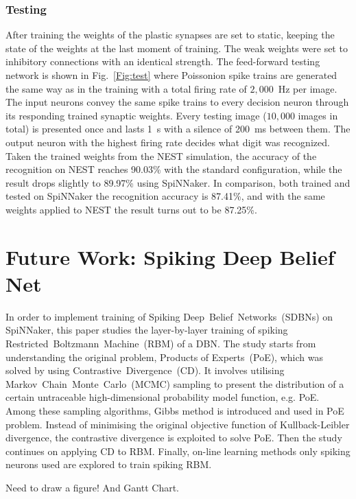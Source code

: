 \documentclass[journal]{journal}
\begin{document}
	\subsubsection{Testing}
	After training the weights of the plastic synapses are set to static, keeping the state of the weights at the last moment of training.
	The weak weights were set to inhibitory connections with an identical strength.
	The feed-forward testing network is shown in Fig.~\ref{Fig:test} where Poissonion spike trains are generated the same way as in the training with a total firing rate of $2,000$~Hz per image.
	The input neurons convey the same spike trains to every decision neuron through its responding trained synaptic weights. 
	Every testing image ($10,000$ images in total) is presented once and lasts 1~s with a silence of 200~ms between them.
	The output neuron with the highest firing rate decides what digit was recognized.
	Taken the trained weights from the NEST simulation, the accuracy of the recognition on NEST reaches 90.03\% with the standard configuration, while the result drops slightly to 89.97\% using SpiNNaker.
	In comparison, both trained and tested on SpiNNaker the recognition accuracy is 87.41\%, and with the same weights applied to NEST the result turns out to be 87.25\%.  
\section{Future Work: Spiking Deep Belief Net}
	In order to implement training of Spiking Deep~Belief~Networks~(SDBNs) on SpiNNaker, this paper studies the layer-by-layer training of spiking Restricted~Boltzmann~Machine~(RBM) of a DBN.
	The study starts from understanding the original problem, Products of Experts~(PoE), which was solved by using Contrastive~Divergence~(CD).
	It involves utilising Markov~Chain~Monte~Carlo~(MCMC) sampling to present the distribution of a certain untraceable high-dimensional probability model function, e.g. PoE.
	Among these sampling algorithms, Gibbs method is introduced and used in PoE problem.
	Instead of minimising the original objective function of Kullback-Leibler divergence, the contrastive divergence is exploited to solve PoE.
	Then the study continues on applying CD to RBM.
	Finally, on-line learning methods only spiking neurons used are explored to train spiking RBM.
	
	Need to draw a figure!
	And Gantt Chart.
	
\end{document}
